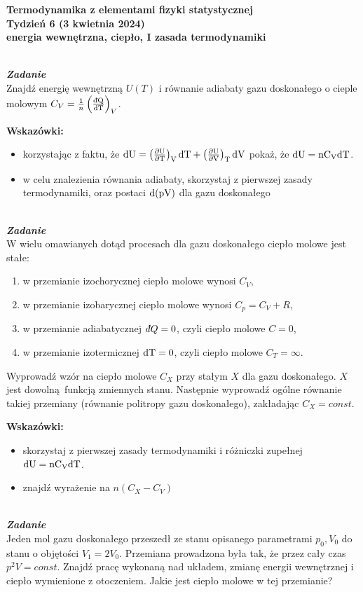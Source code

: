 \documentclass[11pt,a4paper]{article}
\newcounter{zadanie}\newcommand{\zadanie}[1][]{\addtocounter{zadanie}{1} ~\\  {\bf \emph{Zadanie \arabic{zadanie} #1 }} \\}
\newcommand{\dbar}{{\mkern3mu\mathchar'26\mkern-12mu d}}
\begin{document}

\begin{centering}
\bf{\Large{Termodynamika z elementami fizyki statystycznej}}\\
Tydzień 6  (3 kwietnia 2024)\\[3mm]
energia wewnętrzna, ciepło, I zasada termodynamiki \\ 
\end{centering} 
\vspace{5mm}

\zadanie
Znajdź energię wewnętrzną $U(T)$ i równanie adiabaty gazu doskonałego o cieple molowym
$C_V = \frac{1}{n}\left( \frac{\rm{\dbar}Q}{\rm{d}T}\right)_V$.

\textbf{Wskazówki:}
\begin{itemize}
  \item korzystając z faktu, że
    $\rm{d}U = \left(\frac{\partial U}{\partial T}\right)_V \rm{d}T + \left(\frac{\partial U}{\partial V}\right)_T \rm{d}V$
    pokaż, że $\rm{d}U = n C_V \rm{d}T$.
  \item w celu znalezienia równania adiabaty, skorzystaj z pierwszej zasady termodynamiki,
    oraz postaci $\rm{d}(pV)$ dla gazu doskonałego\\
\end{itemize}
\zadanie
W wielu omawianych dotąd procesach dla gazu doskonałego ciepło molowe jest stałe:
\begin{enumerate}
\item w przemianie izochorycznej ciepło molowe wynosi $C_V$,
\item w przemianie izobarycznej ciepło molowe wynosi $C_p = C_V + R$,
\item w przemianie adiabatycznej $\dbar Q = 0$, czyli ciepło molowe $C = 0$,
\item w przemianie izotermicznej $\rm{d}T = 0$, czyli ciepło molowe $C_T = \infty$.
\end{enumerate}
Wyprowadź wzór na ciepło molowe $C_X$ przy stałym $X$ dla gazu doskonałego.
$X$ jest dowolną funkcją zmiennych stanu. Następnie wyprowadź ogólne równanie 
takiej przemiany (równanie politropy gazu doskonałego), zakładając $C_X=const$.

\textbf{Wskazówki:}
\begin{itemize}
\item skorzystaj z pierwszej zasady termodynamiki i różniczki zupełnej $\rm{d}U = n C_V \rm{d}T$.
\item znajdź wyrażenie na $n(C_X - C_V)$
\end{itemize}
\zadanie
Jeden mol gazu doskonałego przeszedł ze stanu opisanego parametrami
$p_0, V_0$ do stanu o objętości $V_1 = 2 V_0$.
Przemiana prowadzona była tak, że przez cały czas $p^2 V = const$.
Znajdź pracę wykonaną nad układem, zmianę energii wewnętrznej i ciepło wymienione z otoczeniem.
Jakie jest ciepło molowe w tej przemianie?
\end{document}

